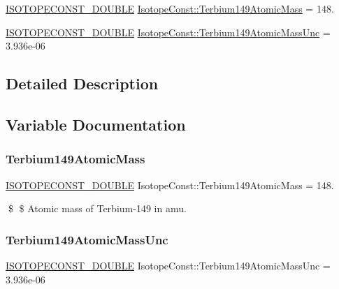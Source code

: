 \begin{DoxyCompactItemize}
\item 
\mbox{\hyperlink{group___isotope_const-_macros_ga8f45a7272ce02c0b4c65c44636ed719a}{I\+S\+O\+T\+O\+P\+E\+C\+O\+N\+S\+T\+\_\+\+D\+O\+U\+B\+LE}} \mbox{\hyperlink{group___isotope_const-_terbium-_tb149_ga942225685c16311179b4f1eacf8e3557}{Isotope\+Const\+::\+Terbium149\+Atomic\+Mass}} = 148.
\item 
\mbox{\hyperlink{group___isotope_const-_macros_ga8f45a7272ce02c0b4c65c44636ed719a}{I\+S\+O\+T\+O\+P\+E\+C\+O\+N\+S\+T\+\_\+\+D\+O\+U\+B\+LE}} \mbox{\hyperlink{group___isotope_const-_terbium-_tb149_ga74075bda1c507ea37b67d67dbaf029e6}{Isotope\+Const\+::\+Terbium149\+Atomic\+Mass\+Unc}} = 3.\+936e-\/06
\end{DoxyCompactItemize}


\subsection{Detailed Description}


\subsection{Variable Documentation}
\mbox{\label{group___isotope_const-_terbium-_tb149_ga942225685c16311179b4f1eacf8e3557}} 
\subsubsection{\texorpdfstring{Terbium149\+Atomic\+Mass}{Terbium149AtomicMass}}
{\footnotesize\ttfamily \mbox{\hyperlink{group___isotope_const-_macros_ga8f45a7272ce02c0b4c65c44636ed719a}{I\+S\+O\+T\+O\+P\+E\+C\+O\+N\+S\+T\+\_\+\+D\+O\+U\+B\+LE}} Isotope\+Const\+::\+Terbium149\+Atomic\+Mass = 148.}

\$ \$ Atomic mass of Terbium-\/149 in amu. \mbox{\label{group___isotope_const-_terbium-_tb149_ga74075bda1c507ea37b67d67dbaf029e6}} 
\subsubsection{\texorpdfstring{Terbium149\+Atomic\+Mass\+Unc}{Terbium149AtomicMassUnc}}
{\footnotesize\ttfamily \mbox{\hyperlink{group___isotope_const-_macros_ga8f45a7272ce02c0b4c65c44636ed719a}{I\+S\+O\+T\+O\+P\+E\+C\+O\+N\+S\+T\+\_\+\+D\+O\+U\+B\+LE}} Isotope\+Const\+::\+Terbium149\+Atomic\+Mass\+Unc = 3.\+936e-\/06}

